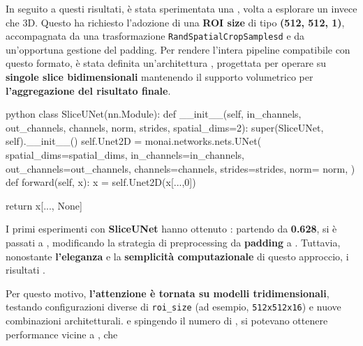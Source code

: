 
In seguito a questi risultati, è stata sperimentata una , volta a esplorare un  invece che 3D. Questo ha richiesto l’adozione di una \textbf{ROI size} di tipo \textbf{(512, 512, 1)}, accompagnata da una trasformazione \texttt{RandSpatialCropSamplesd} e da un’opportuna gestione del padding. Per rendere l’intera pipeline compatibile con questo formato, è stata definita un’architettura , progettata per operare su \textbf{singole slice bidimensionali} mantenendo il supporto volumetrico per \textbf{l’aggregazione del risultato finale}.

\begin{code}{python}
class SliceUNet(nn.Module):
    def __init__(self, in_channels, out_channels, 
                channels, norm, strides, spatial_dims=2):
        super(SliceUNet, self).__init__()
        self.Unet2D = monai.networks.nets.UNet(
            spatial_dims=spatial_dims,
            in_channels=in_channels,
            out_channels=out_channels,
            channels=channels,
            strides=strides,
            norm= norm,
        )
    def forward(self, x):
        x = self.Unet2D(x[...,0]) 

        return x[..., None]
\end{code}



I primi esperimenti con \textbf{SliceUNet} hanno ottenuto : partendo da \textbf{0.628}, si è passati a , modificando la strategia di preprocessing da \textbf{padding} a . Tuttavia, nonostante \textbf{l’eleganza} e la \textbf{semplicità computazionale} di questo approccio, i risultati .


Per questo motivo, \textbf{l’attenzione è tornata su modelli tridimensionali}, testando configurazioni diverse di \texttt{roi\_size} (ad esempio, \texttt{512x512x16}) e nuove combinazioni architetturali.  e spingendo il numero di , si potevano ottenere performance vicine a , che 

